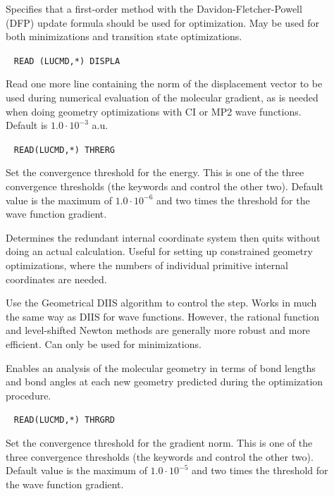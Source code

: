 \begin{description}
\item[]
Specifies that a first-order method with the
Davidon-Fletcher-Powell (DFP) update
formula should be used for optimization. May be used for both
minimizations and transition state optimizations.

\item[]\verb| |\newline
\verb|READ (LUCMD,*) DISPLA|

Read one more line containing the norm of the displacement vector to
be used during numerical evaluation of the molecular gradient, as is
needed when doing geometry optimizations with CI or MP2 wave
functions. Default is $1.0\cdot 10^{-3}$ a.u.

\item[]\verb| |
\newline
\verb|READ(LUCMD,*) THRERG|

Set the convergence threshold for the energy. This is one of the three
convergence thresholds (the keywords
 and 
control the other two). Default value is the maximum of $1.0\cdot
10^{-6}$ and two times the threshold for the wave function gradient.

\item[]
Determines the redundant internal coordinate system then quits without
doing an actual calculation. Useful for setting up constrained
geometry optimizations, where the numbers of individual primitive
internal coordinates are needed.

\item[]
Use the Geometrical DIIS\cite{pcppjms114}
algorithm to control the
step. Works in much the same way as DIIS for wave functions. However,
the rational function and level-shifted Newton methods are generally
more robust and more efficient. Can only be used for minimizations.

\item[]
Enables an analysis of the molecular geometry in terms of bond lengths
and bond angles at each new geometry predicted during the optimization
procedure.

\item[]\verb| |
\newline
\verb|READ(LUCMD,*) THRGRD|

Set the convergence threshold for the gradient norm. This is one of
the three convergence thresholds (the keywords  and
 control the other two). Default value is the maximum of
$1.0\cdot 10^{-5}$ and two times the threshold for the wave function
gradient.


\end{description}
